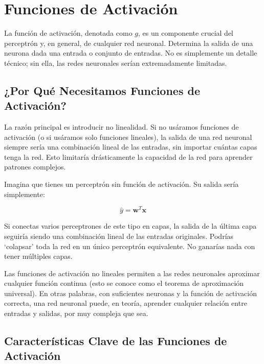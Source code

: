 \documentclass{article}
\begin{document}
\section{Funciones de Activación}

La función de activación, denotada como \(g\), es un componente crucial del perceptrón y, en general, de cualquier red neuronal.  Determina la salida de una neurona dada una entrada o conjunto de entradas.  No es simplemente un detalle técnico; sin ella, las redes neuronales serían extremadamente limitadas.

\subsection{¿Por Qué Necesitamos Funciones de Activación?}

La razón principal es introducir no linealidad.  Si no usáramos funciones de activación (o si usáramos solo funciones lineales), la salida de una red neuronal siempre sería una combinación lineal de las entradas, sin importar cuántas capas tenga la red. Esto limitaría drásticamente la capacidad de la red para aprender patrones complejos.

Imagina que tienes un perceptrón sin función de activación.  Su salida sería simplemente:

\[
\hat{y} = \mathbf{w}^T \mathbf{x}
\]

Si conectas varios perceptrones de este tipo en capas, la salida de la última capa seguiría siendo una combinación lineal de las entradas originales.  Podrías `colapsar' toda la red en un único perceptrón equivalente. No ganarías nada con tener múltiples capas.

Las funciones de activación no lineales permiten a las redes neuronales aproximar cualquier función continua (esto se conoce como el teorema de aproximación universal).  En otras palabras, con suficientes neuronas y la función de activación correcta, una red neuronal puede, en teoría, aprender cualquier relación entre entradas y salidas, por muy compleja que sea.

\subsection{Características Clave de las Funciones de Activación}
\end{document}
